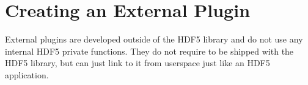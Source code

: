 \section{Creating an External Plugin}
External plugins are developed outside of the HDF5 library and do not
use any internal HDF5 private functions. They do not require to be
shipped with the HDF5 library, but can just link to it from userspace
just like an HDF5 application.

